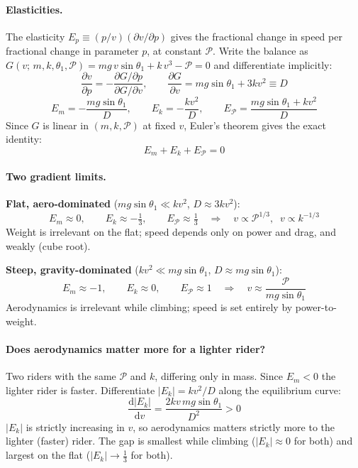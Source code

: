 \documentclass[10pt]{extarticle}
\numberwithin{equation}{subsubsection}
\begin{document}
\paragraph{Elasticities.}
The elasticity $E_p \equiv (p/v)(\partial v/\partial p)$ gives the fractional change in speed per
fractional change in parameter $p$, at constant $\mathcal{P}$. Write the balance as
$G(v;\,m,k,\theta_1,\mathcal{P}) = mg\,v\sin\theta_1 + k\,v^3 - \mathcal{P} = 0$ and
differentiate implicitly:
\begin{equation}
    \frac{\partial v}{\partial p} = -\frac{\partial G/\partial p}{\partial G/\partial v},
    \qquad
    \frac{\partial G}{\partial v} = mg\sin\theta_1 + 3kv^2 \equiv D
\end{equation}
\begin{equation}
    \boxed{E_m = -\frac{mg\sin\theta_1}{D}, \qquad
           E_k = -\frac{kv^2}{D}, \qquad
           E_{\mathcal{P}} = \frac{mg\sin\theta_1 + kv^2}{D}}
\end{equation}
Since $G$ is linear in $(m, k, \mathcal{P})$ at fixed $v$, Euler's theorem gives the exact identity:
\begin{equation}
    E_m + E_k + E_{\mathcal{P}} = 0
\end{equation}

\paragraph{Two gradient limits.}
\textbf{Flat, aero-dominated} ($mg\sin\theta_1 \ll kv^2$, $D \approx 3kv^2$):
\begin{equation}
    E_m \approx 0, \qquad E_k \approx -\tfrac{1}{3}, \qquad E_{\mathcal{P}} \approx \tfrac{1}{3}
    \quad\Longrightarrow\quad v \propto \mathcal{P}^{1/3},\;\; v \propto k^{-1/3}
\end{equation}
Weight is irrelevant on the flat; speed depends only on power and drag, and weakly (cube root).

\textbf{Steep, gravity-dominated} ($kv^2 \ll mg\sin\theta_1$, $D \approx mg\sin\theta_1$):
\begin{equation}
    E_m \approx -1, \qquad E_k \approx 0, \qquad E_{\mathcal{P}} \approx 1
    \quad\Longrightarrow\quad v \approx \frac{\mathcal{P}}{mg\sin\theta_1}
\end{equation}
Aerodynamics is irrelevant while climbing; speed is set entirely by power-to-weight.

\paragraph{Does aerodynamics matter more for a lighter rider?}
Two riders with the same $\mathcal{P}$ and $k$, differing only in mass. Since $E_m < 0$ the
lighter rider is faster. Differentiate $|E_k| = kv^2/D$ along the equilibrium curve:
\begin{equation}
    \frac{\mathrm{d}|E_k|}{\mathrm{d}v} = \frac{2kv\,mg\sin\theta_1}{D^2} > 0
\end{equation}
$|E_k|$ is strictly increasing in $v$, so aerodynamics matters strictly more to the lighter
(faster) rider. The gap is smallest while climbing ($|E_k|\approx 0$ for both) and largest on
the flat ($|E_k|\to\tfrac{1}{3}$ for both).
\end{document}
